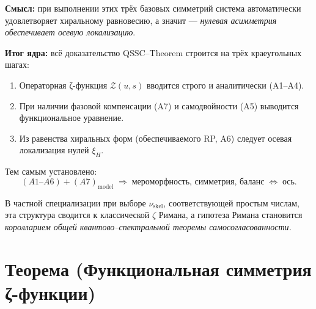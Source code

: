 \documentclass{article}
\numberwithin{equation}{section}
\theoremstyle{plain}
\theoremstyle{definition}
\theoremstyle{remark}
\def\Rightarrow{⇒}%
\def\Leftrightarrow{⇔}%
\begin{document}
\noindent
\textbf{Смысл:} при выполнении этих трёх базовых симметрий система автоматически удовлетворяет хиральному равновесию,
а значит — \emph{нулевая асимметрия обеспечивает осевую локализацию}.

\noindent
\textbf{Итог ядра:}
всё доказательство QSSC–Theorem строится на трёх краеугольных шагах:

\begin{enumerate}
\item Операторная ζ-функция $\mathcal Z(u,s)$ вводится строго и аналитически (A1–A4).
\item При наличии фазовой компенсации (A7) и самодвойности (A5) выводится функциональное уравнение.
\item Из равенства хиральных форм (обеспечиваемого RP, A6) следует осевая локализация нулей $\xi_H$.
\end{enumerate}

\noindent
Тем самым установлено:
\begin{equation}
(A1\text{–}A6) + (A7)_{\mathrm{model}} \;\Rightarrow\;
\text{мероморфность, симметрия, баланс}\;\Leftrightarrow\;\text{ось.}
\label{eq:QSSC0050}
\end{equation}


\noindent
В частной специализации при выборе $\nu_{\mathrm{skel}}$, соответствующей простым числам,  
эта структура сводится к классической $\zeta$ Римана, а гипотеза Римана 
становится \emph{королларием общей квантово–спектральной теоремы самосогласованности.}

\clearpage

\section{Теорема (Функциональная симметрия ζ-функции)}
\end{document}
